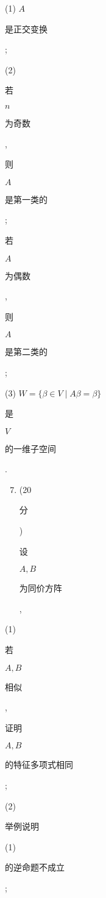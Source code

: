 \documentclass[10pt]{article}
\begin{document}
(1) $A$ \begin{CJK}{UTF8}{mj}是正交变换\end{CJK};

(2) \begin{CJK}{UTF8}{mj}若\end{CJK} $n$ \begin{CJK}{UTF8}{mj}为奇数\end{CJK}, \begin{CJK}{UTF8}{mj}则\end{CJK} $A$ \begin{CJK}{UTF8}{mj}是第一类的\end{CJK}; \begin{CJK}{UTF8}{mj}若\end{CJK} $A$ \begin{CJK}{UTF8}{mj}为偶数\end{CJK}, \begin{CJK}{UTF8}{mj}则\end{CJK} $A$ \begin{CJK}{UTF8}{mj}是第二类的\end{CJK};

(3) $W=\{\beta \in V \mid A \beta=\beta\}$ \begin{CJK}{UTF8}{mj}是\end{CJK} $V$ \begin{CJK}{UTF8}{mj}的一维子空间\end{CJK}.

\begin{enumerate}
  \setcounter{enumi}{6}
  \item (20 \begin{CJK}{UTF8}{mj}分\end{CJK}) \begin{CJK}{UTF8}{mj}设\end{CJK} $A, B$ \begin{CJK}{UTF8}{mj}为同价方阵\end{CJK},
\end{enumerate}
(1) \begin{CJK}{UTF8}{mj}若\end{CJK} $A, B$ \begin{CJK}{UTF8}{mj}相似\end{CJK}, \begin{CJK}{UTF8}{mj}证明\end{CJK} $A, B$ \begin{CJK}{UTF8}{mj}的特征多项式相同\end{CJK};

(2) \begin{CJK}{UTF8}{mj}举例说明\end{CJK} (1) \begin{CJK}{UTF8}{mj}的逆命题不成立\end{CJK};
\end{document}
